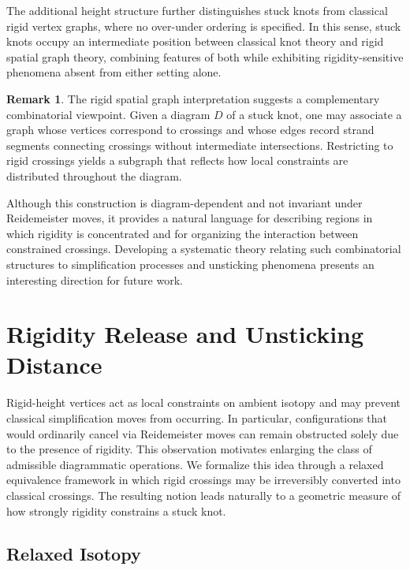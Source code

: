 \documentclass[11pt,a4paper]{article}
\theoremstyle{plain}
\theoremstyle{definition}
\newtheorem{remark}[theorem]{Remark}
\begin{document}
The additional height structure further distinguishes stuck knots from classical rigid vertex graphs, where no over-under ordering is specified. In this sense, stuck knots occupy an intermediate position between classical knot theory and rigid spatial graph theory, combining features of both while exhibiting rigidity-sensitive phenomena absent from either setting alone.

\begin{remark}
The rigid spatial graph interpretation suggests a complementary combinatorial viewpoint. 
Given a diagram $D$ of a stuck knot, one may associate a graph whose vertices correspond to crossings and whose edges record strand segments connecting crossings without intermediate intersections. Restricting to rigid crossings yields a subgraph that reflects how local constraints are distributed throughout the diagram.

Although this construction is diagram-dependent and not invariant under Reidemeister moves, it provides a natural language for describing regions in which rigidity is concentrated and for organizing the interaction between constrained crossings. Developing a systematic theory relating such combinatorial structures to simplification processes and unsticking phenomena presents an interesting direction for future work.
\end{remark}




\section{Rigidity Release and Unsticking Distance}\label{sec:Unsticking Distance}

Rigid-height vertices act as local constraints on ambient isotopy and may prevent classical simplification moves from occurring. In particular, configurations that would ordinarily cancel via Reidemeister moves can remain obstructed solely due to the presence of rigidity. This observation motivates enlarging the class of admissible diagrammatic operations. We formalize this idea through a relaxed equivalence framework in which rigid crossings may be irreversibly converted into classical crossings. The resulting notion leads naturally to a geometric measure of how strongly rigidity constrains a stuck knot.

\subsection{Relaxed Isotopy}
\end{document}
